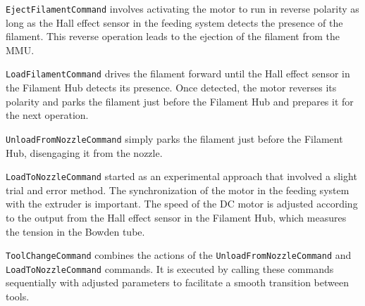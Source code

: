\texttt{EjectFilamentCommand} involves activating the motor to run in reverse polarity as long as the Hall effect sensor in the feeding system detects the presence of the filament. This reverse operation leads to the ejection of the filament from the MMU.

\texttt{LoadFilamentCommand} drives the filament forward until the Hall effect sensor in the Filament Hub detects its presence. Once detected, the motor reverses its polarity and parks the filament just before the Filament Hub and prepares it for the next operation.

\texttt{UnloadFromNozzleCommand} simply parks the filament just before the Filament Hub, disengaging it from the nozzle.

\texttt{LoadToNozzleCommand} started as an experimental approach that involved a slight trial and error method. The synchronization of the motor in the feeding system with the extruder is important. The speed of the DC motor is adjusted according to the output from the Hall effect sensor in the Filament Hub, which measures the tension in the Bowden tube.

\texttt{ToolChangeCommand} combines the actions of the \texttt{UnloadFromNozzleCommand} and \texttt{LoadToNozzleCommand} commands. It is executed by calling these commands sequentially with adjusted parameters to facilitate a smooth transition between tools.

